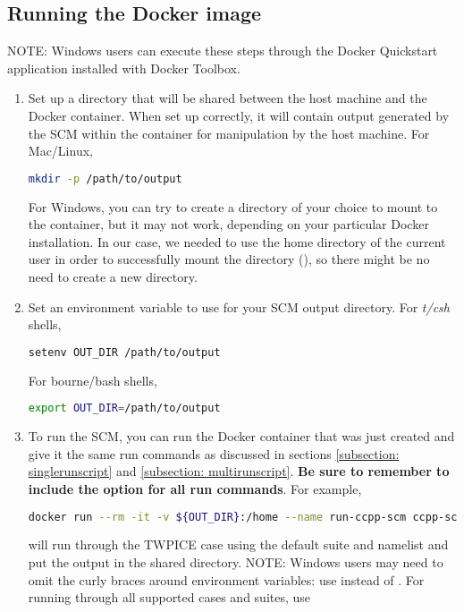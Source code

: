\subsection{Running the Docker image}

NOTE: Windows users can execute these steps through the Docker Quickstart application installed with Docker Toolbox.

\begin{enumerate}
\item Set up a directory that will be shared between the host machine and the Docker container. When set up correctly, it will contain output generated by the SCM within the container for manipulation by the host machine. For Mac/Linux,
\begin{lstlisting}[language=bash]
mkdir -p /path/to/output
\end{lstlisting}
For Windows, you can try to create a directory of your choice to mount to the container, but it may not work, depending on your particular Docker installation. In our case, we needed to use the home directory of the current user in order to successfully mount the directory (), so there might be no need to create a new directory.
\item Set an environment variable to use for your SCM output directory. For \textit{t/csh} shells,
\begin{lstlisting}[language=bash]
setenv OUT_DIR /path/to/output
\end{lstlisting}
For bourne/bash shells,
\begin{lstlisting}[language=bash]
export OUT_DIR=/path/to/output
\end{lstlisting}
\item To run the SCM, you can run the Docker container that was just created and give it the same run commands as discussed in sections \ref{subsection: singlerunscript} and \ref{subsection: multirunscript}. \textbf{Be sure to remember to include the  option for all run commands}. For example,
\begin{lstlisting}[language=bash]
docker run --rm -it -v ${OUT_DIR}:/home --name run-ccpp-scm ccpp-scm ./run_gmtb_scm.py -c twpice -d
\end{lstlisting}
will run through the TWPICE case using the default suite and namelist and put the output in the shared directory. NOTE: Windows users may need to omit the curly braces around environment variables: use  instead of . For running through all supported cases and suites, use

\end{enumerate}
